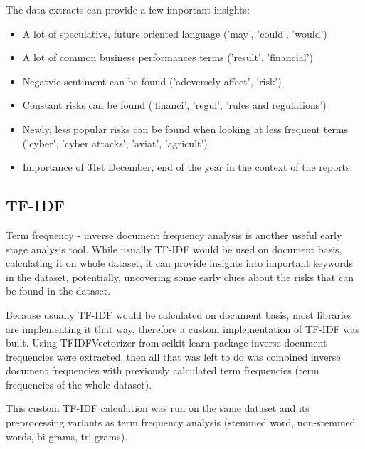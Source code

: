 The data extracts can provide a few important insights:
\begin{itemize}
\item A lot of speculative, future oriented language ('may', 'could', 'would')
\item A lot of common business performances terms ('result', 'financial')
\item Negatvie sentiment can be found ('adeversely affect', 'risk')
\item Constant risks can be found ('financi', 'regul', 'rules and regulations')
\item Newly, less popular risks can be found when looking at less frequent terms ('cyber', 'cyber attacks', 'aviat', 'agricult')
\item Importance of 31st December, end of the year in the context of the reports.
\end{itemize} 

\subsection{TF-IDF}
Term frequency - inverse document frequency analysis is another useful early stage analysis tool. While usually TF-IDF would be used on document basis, calculating it on whole dataset, it can provide insights into important keywords in the dataset, potentially, uncovering some early clues about the risks that can be found in the dataset.

Because usually TF-IDF would be calculated on document basis, most libraries are implementing it that way, therefore a custom implementation of TF-IDF was built. Using TFIDFVectorizer from scikit-learn package \cite{sklearnhome} inverse document frequencies were extracted, then all that was left to do was combined inverse document frequencies with previously calculated term frequencies (term frequencies of the whole dataset).

This custom TF-IDF calculation was run on the same dataset and its preprocessing variants as term frequency analysis (stemmed word, non-stemmed words, bi-grams, tri-grams).

